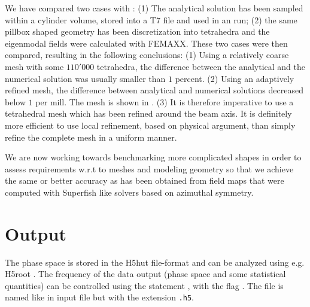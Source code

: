 We have compared two cases with \opal: (1) The analytical solution has been
sampled within a cylinder volume, stored into a T7 file and used in an \opal
run; (2) the same pillbox shaped geometry has been discretization into tetrahedra
and the eigenmodal fields were calculated with FEMAXX.
These two cases were then compared, resulting in the following conclusions:
(1) Using a relatively coarse mesh with some $110'000$ tetrahedra, the difference
between the analytical and the numerical solution was usually smaller than
$1$ percent.
(2) Using an adaptively refined mesh, the difference between analytical and
numerical solutions decreased below $1$ per mill. The mesh is shown
in .
(3) It is therefore imperative to use a tetrahedral mesh which has been
refined around the beam axis. It is definitely more efficient to use local
refinement, based on physical argument, than simply refine the complete
mesh in a uniform manner.


We are now working towards benchmarking more complicated shapes in order to
assess requirements w.r.t to meshes and modeling geometry so that we
achieve the same or better accuracy as has been obtained from field
maps that were computed with Superfish like solvers based on azimuthal symmetry.


\section{Output}
The phase space is stored in the H5hut file-format \cite{bib:howison2010} and can be analyzed
using e.g. H5root \cite{bib:schietinger}. The frequency
of the data output (phase space and some statistical quantities) can be controlled using the  statement ,
 with the flag . The file is named like in input file but with the extension {\tt .h5}.

